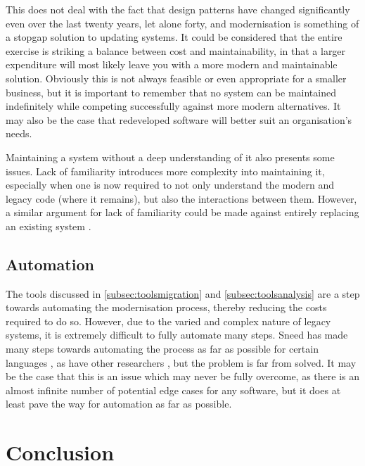 \documentclass[12pt,journal,compsoc]{IEEEtran}
\begin{document}
This does not deal with the fact that design patterns have changed significantly even over the last twenty years, let alone forty, and modernisation is something of a stopgap solution to updating systems. It could be considered that the entire exercise is striking a balance between cost and maintainability, in that a larger expenditure will most likely leave you with a more modern and maintainable solution. Obviously this is not always feasible or even appropriate for a smaller business, but it is important to remember that no system can be maintained indefinitely while competing successfully against more modern alternatives. It may also be the case that redeveloped software will better suit an organisation's needs.

Maintaining a system without a deep understanding of it also presents some issues. Lack of familiarity introduces more complexity into maintaining it, especially when one is now required to not only understand the modern and legacy code (where it remains), but also the interactions between them. However, a similar argument for lack of familiarity could be made against entirely replacing an existing system \cite{Almonaies2010}.

\subsection{Automation}
\label{subsec:automation}
The tools discussed in \autoref{subsec:toolsmigration} and \autoref{subsec:toolsanalysis} are a step towards automating the modernisation process, thereby reducing the costs required to do so. However, due to the varied and complex nature of legacy systems, it is extremely difficult to fully automate many steps. Sneed has made many steps towards automating the process as far as possible for certain languages \cite{Sneed2013,Sneed2011,Sneed2008,Sneed2009,Sneed1996,Sneed2001}, as have other researchers \cite{Deursen1998,Aversano2001,Chiang2001,Wu2005,O'Brien2005,Distante2006}, but the problem is far from solved. It may be the case that this is an issue which may never be fully overcome, as there is an almost infinite number of potential edge cases for any software, but it does at least pave the way for automation as far as possible.

\section{Conclusion}
\label{sec:conclusion}
\end{document}
